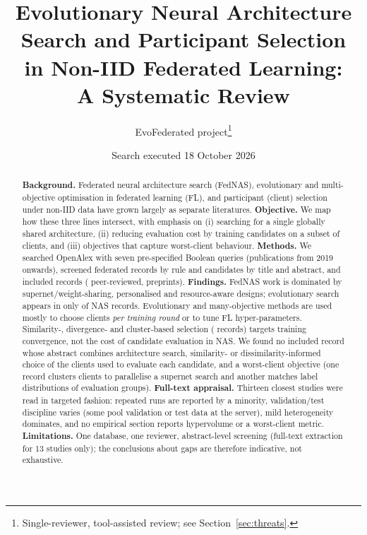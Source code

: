 \documentclass[11pt,a4paper]{article}
\title{Evolutionary Neural Architecture Search and Participant Selection\\in Non-IID Federated Learning:\\A Systematic Review}
\author{EvoFederated project\thanks{Single-reviewer, tool-assisted review; see Section~\ref{sec:threats}.}}
\date{Search executed 18 October 2026}
\begin{document}
\maketitle

\begin{abstract}
\noindent\textbf{Background.} Federated neural architecture search (FedNAS), evolutionary and multi-objective optimisation in federated learning (FL), and participant (client) selection under non-IID data have grown largely as separate literatures. \textbf{Objective.} We map how these three lines intersect, with emphasis on (i) searching for a single globally shared architecture, (ii) reducing evaluation cost by training candidates on a subset of clients, and (iii) objectives that capture worst-client behaviour. \textbf{Methods.} We searched OpenAlex with seven pre-specified Boolean queries (publications from 2019 onwards), screened \pafterfederatedabstractfilter{} federated records by rule and \paftertopicalfilter{} candidates by title and abstract, and included \nN{} records (\npeer{} peer-reviewed, \npre{} preprints). \textbf{Findings.} FedNAS work is dominated by supernet/weight-sharing, personalised and resource-aware designs; evolutionary search appears in only \nnasevo{} of \nnas{} NAS records. Evolutionary and many-objective methods are used mostly to choose clients \emph{per training round} or to tune FL hyper-parameters. Similarity-, divergence- and cluster-based selection (\nselsim{} records) targets training convergence, not the cost of candidate evaluation in NAS. We found no included record whose abstract combines architecture search, similarity- or dissimilarity-informed choice of the clients used to evaluate each candidate, and a worst-client objective (one record clusters clients to parallelise a supernet search and another matches label distributions of evaluation groups). \textbf{Full-text appraisal.} Thirteen closest studies were read in targeted fashion: repeated runs are reported by a minority, validation/test discipline varies (some pool validation or test data at the server), mild heterogeneity dominates, and no empirical section reports hypervolume or a worst-client metric. \textbf{Limitations.} One database, one reviewer, abstract-level screening (full-text extraction for 13 studies only); the conclusions about gaps are therefore indicative, not exhaustive.
\end{abstract}
\end{document}
